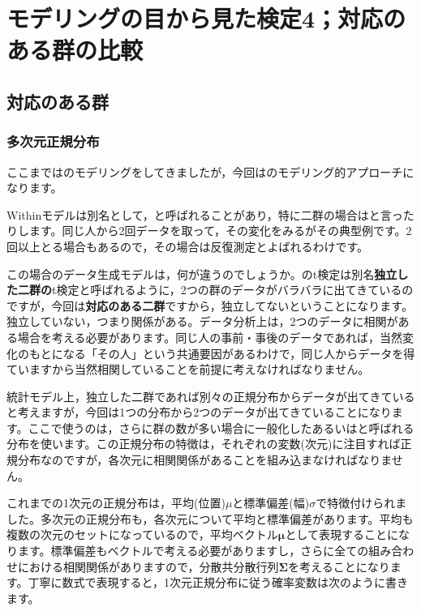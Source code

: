 \documentclass{ltjsbook}
\begin{document}
 
\VerbatimFootnotes
\chapter{モデリングの目から見た検定4；対応のある群の比較}
\label{chapter22} 
\section{対応のある群}
\subsection{多次元正規分布}
ここまではのモデリングをしてきましたが，今回はのモデリング的アプローチになります。

Withinモデルは別名として，と呼ばれることがあり，特に二群の場合はと言ったりします。同じ人から2回データを取って，その変化をみるがその典型例です。2回以上とる場合もあるので，その場合は反復測定とよばれるわけです。

この場合のデータ生成モデルは，何が違うのでしょうか。のt検定は別名\textbf{独立した二群の}t検定と呼ばれるように，2つの群のデータがバラバラに出てきているのですが，今回は\textbf{対応のある二群}ですから，独立してないということになります。独立していない，つまり関係がある。データ分析上は，2つのデータに相関がある場合を考える必要があります。同じ人の事前・事後のデータであれば，当然変化のもとになる「その人」という共通要因があるわけで，同じ人からデータを得ていますから当然相関していることを前提に考えなければなりません。

統計モデル上，独立した二群であれば別々の正規分布からデータが出てきていると考えますが，今回は1つの分布から2つのデータが出てきていることになります。ここで使うのは，さらに群の数が多い場合に一般化したあるいはと呼ばれる分布を使います。この正規分布の特徴は，それぞれの変数(次元)に注目すれば正規分布なのですが，各次元に相関関係があることを組み込まなければなりません。

これまでの1次元の正規分布は，平均(位置)$\mu$と標準偏差(幅)$\sigma$で特徴付けられました。多次元の正規分布も，各次元について平均と標準偏差があります。平均も複数の次元のセットになっているので，平均ベクトル$\bm{\mu}$として表現することになります。標準偏差もベクトルで考える必要がありますし，さらに全ての組み合わせにおける相関関係がありますので，分散共分散行列$\bm{\Sigma}$を考えることになります。丁寧に数式で表現すると，1次元正規分布に従う確率変数は次のように書きます。
\end{document}
